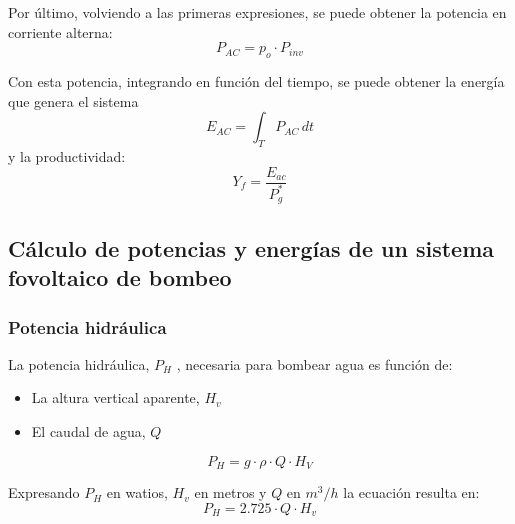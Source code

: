 Por último, volviendo a las primeras expresiones, se puede obtener la potencia en corriente alterna:
\begin{equation}
P_{AC}=p_o\cdot P_{inv}
\end{equation}

Con esta potencia, integrando en función del tiempo, se puede obtener la energía que genera el sistema
\begin{equation}
E_{AC}=\int_{T} P_{AC} \,dt
\end{equation}
y la productividad:
\begin{equation}
Y_f=\frac{E_{ac}}{P_g^*}
\end{equation}

\subsection{Cálculo de potencias y energías de un sistema fovoltaico de bombeo}
\label{sec:org86e6c02}
\subsubsection{Potencia hidráulica}
\label{sec:org88aae2e}
La potencia hidráulica, \(P_H\) , necesaria para bombear agua es función de:
\begin{itemize}
\item La altura vertical aparente, \(H_v\) 
\item El caudal de agua, \(Q\)   
\end{itemize}
\begin{equation}
P_H=g\cdot \rho \cdot Q \cdot H_V
\end{equation}

Expresando \(P_H\) en watios, \(H_v\) en metros y \(Q\) en \(m^3/h\) la ecuación resulta en:
\begin{equation}
P_H=2.725\cdot Q \cdot H_v
\end{equation}

